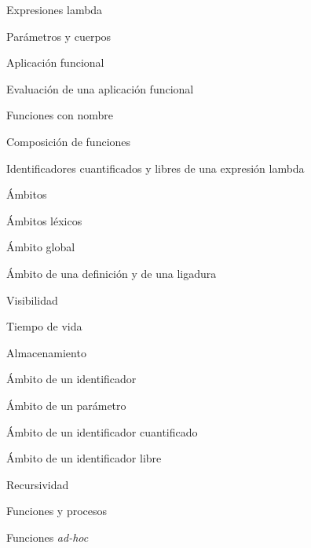 \begin{longenum}
\begin{longenum}
        \begin{longenum}
            \item Expresiones lambda
            \item Parámetros y cuerpos
            \item Aplicación funcional
            \begin{longenum}
                \item Evaluación de una aplicación funcional
                \item Funciones con nombre
                \item Composición de funciones
            \end{longenum}
            \item Identificadores cuantificados y libres de una expresión lambda
        \end{longenum}
        \item Ámbitos
        \begin{longenum}
            \item Ámbitos léxicos
            \begin{longenum}
                \item Ámbito global
            \end{longenum}
            \item Ámbito de una definición y de una ligadura
            \begin{longenum}
                \item Visibilidad
                \item Tiempo de vida
                \item Almacenamiento
            \end{longenum}
            \item Ámbito de un identificador
            \item Ámbito de un parámetro
            \item Ámbito de un identificador cuantificado
            \item Ámbito de un identificador libre
        \end{longenum}
        \item Recursividad \opcional\
        \begin{longenum}
            \item Funciones y procesos
            \begin{longenum}
                \item Funciones \textit{ad-hoc}
            \end{longenum}

\end{longenum}
\end{longenum}
\end{longenum}
